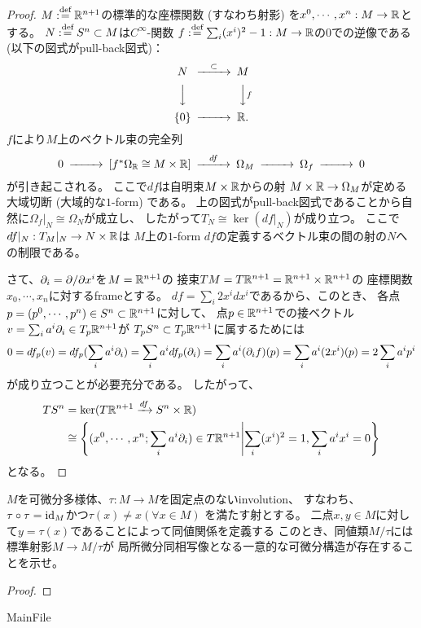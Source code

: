 \documentclass[uplatex,dvipdfmx]{jsarticle}
\begin{document}
\begin{proof}
  \(M:\overset{\mbox{{\scriptsize def}}}{=} \mathbb{R}^{n+1}\)の標準的な座標関数 (すなわち射影)
  を\(x^0,\cdots,x^n : M \to \mathbb{R}\)とする。
  \(N:\overset{\mbox{{\scriptsize def}}}{=} S^n\subset M\)は\(C^{\infty}\)-関数
  \(f:\overset{\mbox{{\scriptsize def}}}{=} \sum_i (x^i)^2 - 1 : M\to \mathbb{R}\)の\(0\)での逆像である
  (以下の図式がpull-back図式)：
  \[
  \begin{CD}
    N @>{\subset}>> M \\
    @VVV @VV{f}V \\
    \{ 0 \} @>>> \R.
  \end{CD}
  \]
  \(f\)により\(M\)上のベクトル束の完全列
  \[
  \begin{CD}
    0 @>>> [f^*\Omega_{\R}\cong M\times \R] @>{df}>> \Omega_M @>>> \Omega_f @>>> 0
  \end{CD}
  \]
  が引き起こされる。
  ここで\(df\)は自明束\(M\times \mathbb{R}\)からの射
  \(M\times \mathbb{R}\to \Omega_M\)が定める大域切断 (大域的な\(1\)-form) である。
  上の図式がpull-back図式であることから自然に\(\Omega_f|_N\cong \Omega_N\)が成立し、
  したがって\(T_N\cong \ker(df|_N)\)が成り立つ。
  ここで\(df|_N:T_M|_N\to N\times \mathbb{R}\)は
  \(M\)上の\(1\)-form \(df\)の定義するベクトル束の間の射の\(N\)への制限である。

  さて、\(\partial_i = \partial/\partial x^i\)を\(M = \mathbb{R}^{n+1}\)の
  接束\(TM = T\mathbb{R}^{n+1} = \mathbb{R}^{n+1}\times \mathbb{R}^{n+1}\)の
  座標関数\(x_0,\cdots,x_n\)に対するframeとする。
  \(df=\sum_i2x^idx^i\)であるから、このとき、
  各点\(p = (p^0,\cdots,p^n)\in S^n\subset \mathbb{R}^{n+1}\)に対して、
  点\(p\in \mathbb{R}^{n+1}\)での接ベクトル\(v = \sum_i a^i\partial_i\in T_p\mathbb{R}^{n+1}\)が
  \(T_pS^n\subset T_p\mathbb{R}^{n+1}\)に属するためには
  \[
  0 = df_p(v) = df_p(\sum_i a^i\partial_i)
  = \sum_i a^idf_p(\partial_i)
  = \sum_i a^i(\partial_if)(p)
  = \sum_i a^i(2x^i)(p)
  = 2 \sum_i a^ip^i
  \]
  が成り立つことが必要充分である。
  したがって、
  \begin{align*}
    TS^n &= \ker(T\R^{n+1} \xrightarrow{df} S^n\times \R) \\
    &\cong \left\{ (x^0,\cdots,x^n;\sum_i a^i\del_i) \in T\R^{n+1} \middle|%
    \sum_i(x^i)^2 = 1,%
    \sum_i a^ix^i = 0 \right\}
  \end{align*}
  となる。
\end{proof}





\begin{prob}\label{1.3}
  \(M\)を可微分多様体、\(\tau:M\to M\)を固定点のないinvolution、
  すなわち、\(\tau\circ \tau = \operatorname{\mathrm{id}}_M\)かつ\(\tau(x)\neq x (\forall x\in M)\)
  を満たす射とする。
  二点\(x,y\in M\)に対して\(y=\tau(x)\)であることによって同値関係を定義する
  このとき、同値類\(M/\tau\)には標準射影\(M\to M/\tau\)が
  局所微分同相写像となる一意的な可微分構造が存在することを示せ。
\end{prob}

\begin{proof}

\end{proof}




\ifcsname MainFile\endcsname\else
\printbibliography
\end{document}
